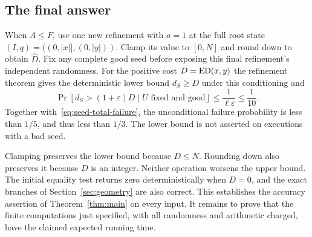 \subsection{The final answer}
When $A\le F$, use one new refinement with $a=1$ at the full root state
$(I,q)=((0,|x|],(0,|y|))$. Clamp its value to $[0,N]$ and round down to
obtain $\widehat D$. Fix any complete good seed before exposing this
final refinement's independent randomness. For the positive cost
$D=\operatorname{ED}(x,y)$ the refinement theorem gives the deterministic lower bound
$d_S\ge D$ under this conditioning and
\[
 \Pr[d_S>(1+\varepsilon)D\mid U\text{ fixed and good}]
 \le\frac{1}{\ell\varepsilon}\le\frac1{10}.
\]
Together with~\eqref{eq:seed-total-failure}, the unconditional failure
probability is less than $1/5$, and thus less than $1/3$. The lower bound
is not asserted on executions with a bad seed.

Clamping preserves the lower bound because $D\le N$. Rounding down also
preserves it because $D$ is an integer. Neither operation worsens the
upper bound. The initial equality test returns zero deterministically
when $D=0$, and the exact branches of Section~\ref{sec:geometry} are also
correct. This establishes the accuracy assertion of
Theorem~\ref{thm:main} on every input. It remains to prove that the
finite computations just specified, with all randomness and arithmetic
charged, have the claimed expected running time.
